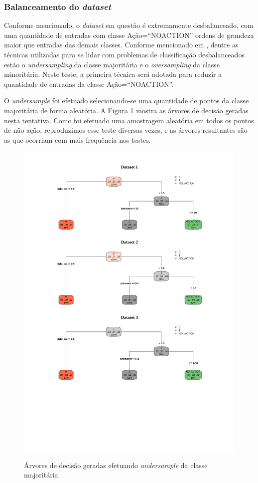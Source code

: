 \subsubsection{Balanceamento do \textit{dataset}}
Conforme mencionado, o \textit{dataset} em questão é extremamente desbalanceado, com uma quantidade de entradas com classe Ação=``NO\underline{\space}ACTION'' ordens de grandeza maior que entradas das demais classes. Conforme mencionado em \cite{han2005}, dentre as técnicas utilizadas para se lidar com problemas de classificação desbalanceados estão o \textit{undersampling} da classe majoritária e o \textit{oversampling} da classe minoritária. Neste teste, a primeira técnica será adotada para reduzir a quantidade de entradas da classe Ação=``NO\underline{\space}ACTION''.

O \textit{undersample} foi efetuado selecionando-se uma quantidade de pontos da classe majoritária de forma aleatória. A Figura \ref{fig:teste_4} mostra as árvores de decisão geradas nesta tentativa. Como foi efetuado uma amostragem aleatória em todos os pontos de não ação, reproduzimos esse teste diversas vezes, e as árvores resultantes são as que ocorriam com mais frequência nos testes.

\begin{figure}[hp]
	\centering
	\caption{Árvores de decisão geradas efetuando \textit{undersample} da classe majoritária.}
  \includegraphics[width=\textwidth]{imagens/teste_learning/4.pdf}
  \label{fig:teste_4}  
\end{figure}

